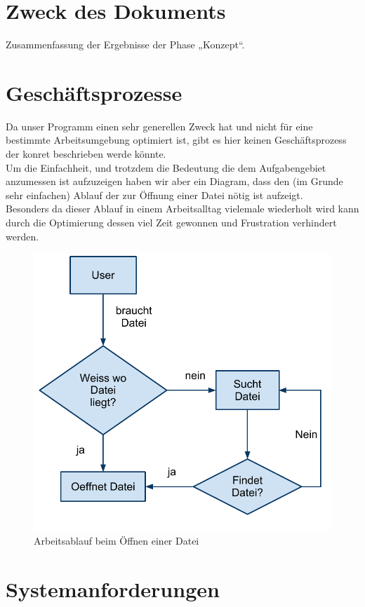 \documentclass[10pt,paper=a4,final]{scrartcl}
\begin{document}
\section{Zweck des Dokuments}
Zusammenfassung der Ergebnisse der Phase „Konzept“.
\section{Geschäftsprozesse}
Da unser Programm einen sehr generellen Zweck hat und nicht f\"ur eine bestimmte Arbeitsumgebung optimiert ist, gibt es hier keinen Gesch\"aftsprozess der konret beschrieben werde k\"onnte.\\

Um die Einfachheit, und trotzdem die Bedeutung die dem Aufgabengebiet anzumessen ist aufzuzeigen haben wir aber ein Diagram, dass den (im Grunde sehr einfachen) Ablauf der zur \"Offnung einer Datei n\"otig ist aufzeigt.\\
Besonders da dieser Ablauf in einem Arbeitsalltag vielemale wiederholt wird kann durch die Optimierung dessen viel Zeit gewonnen und Frustration verhindert werden.
\begin{figure}[h!]
   \includegraphics[width = \textwidth]{arbeitsablauf.pdf}
   \caption{Arbeitsablauf beim \"Offnen einer Datei}
\end{figure}


\section{Systemanforderungen}
\end{document}
